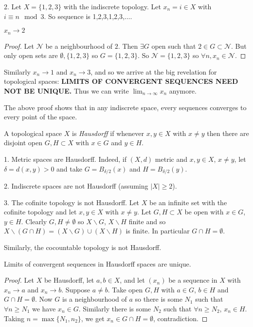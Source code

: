 \begin{example}
2. Let $X = \{1,2,3\}$ with the indiscrete topology. Let $x_n =i\in X$ with $i\equiv n \mod 3$. So sequence is 1,2,3,1,2,3,$\dots$.

\begin{claim}
    $x_n\rightarrow 2$
\end{claim} 
\begin{proof}
Let $\mathcal{N}$ be a neighbourhood of $2$. Then $\exists G$ open such that $2\in G\subset \mathcal{N}$. But only open sets are $\emptyset, \{1,2,3\}$ so $G = \{1,2,3\}$. So $\mathcal{N} = \{1,2,3\}$ so $\forall n, x_n\in\mathcal{N}$. 
\end{proof}
Similarly $x_n\rightarrow 1$ and $x_n\rightarrow 3$, and so we arrive at the big revelation for topological spaces: \textbf{\color{red} LIMITS OF CONVERGENT SEQUENCES NEED NOT BE UNIQUE.} Thus we can write $\lim_{n\rightarrow \infty} x_n$ anymore.
\end{example}

\begin{remark}
The above proof shows that in any indiscrete space, every sequences converges to every point of the space.
\end{remark}

\begin{definition}
A topological space $X$ is \emph{Hausdorff} if whenever $x,y\in X$ with $x\neq y$ then there are disjoint open $G,H\subset X$ with $x\in G$ and $y\in H$.
\end{definition}

\begin{example}
1. Metric spaces are Hausdorff. Indeed, if $(X,d)$ metric and $x,y\in X$, $x\neq y$, let $\delta = d(x,y) >0$ and take $G = B_{\delta/2}(x)$ and $H=B_{\delta/2}(y)$.

2. Indiscrete spaces are not Hausdorff (assuming $|X|\ge 2$).

3. The cofinite topology is not Hausdorff. Let $X$ be an infinite set with the cofinite topology and let $x,y\in X$ with $x\neq y$. Let $G,H\subset X$ be open with $x\in G$, $y\in H$. Clearly $G,H\neq \emptyset$ so $X\backslash G$, $X\backslash H$ finite and so $X\backslash (G\cap H) = (X\backslash G)\cup (X\backslash H)$ is finite. In particular $G\cap H = \emptyset$.

Similarly, the cocountable topology is not Hausdorff.
\end{example}

\begin{proposition}                        %
Limits of convergent sequences in Hausdorff spaces are unique.
\end{proposition}          
\begin{proof}
Let $X$ be Hausdorff, let $a,b\in X$, and let $(x_n)$ be a sequence in $X$ with $x_n\rightarrow a$ and $x_n\rightarrow b$. Suppose $a\neq b$. Take open $G,H$ with $a\in G$, $b\in H$ and $G\cap H = \emptyset$. Now $G$ is a neighbourhood of $a$ so there is some $N_1$ such that $\forall n\ge N_1$ we have $x_n\in G$. Similarly there is some $N_2$ such that $\forall n\ge N_2$, $x_n\in H$. Taking $n = \max\{N_1,n_2\}$, we get $x_n\in G\cap H = \emptyset$, contradiction.
\end{proof}

